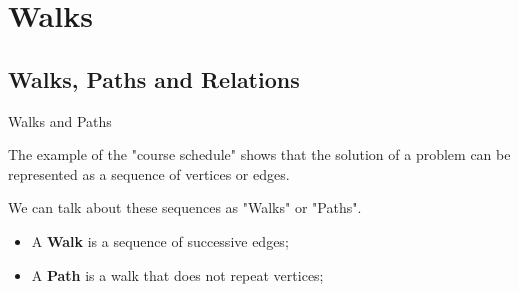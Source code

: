 \section{Walks}


\subsection{Walks, Paths and Relations}

\begin{frame}{Walks and Paths}

  The example of the "course schedule" shows that the solution of a problem can be represented as a sequence of vertices or edges.\bigskip

  We can talk about these sequences as "Walks" or "Paths".\bigskip

  \begin{itemize}
    \item A {\bf Walk} is a sequence of successive edges;\bigskip

    \item A {\bf Path} is a walk that does not repeat vertices;
  \end{itemize}
\end{frame}

